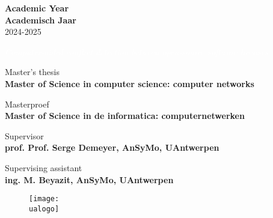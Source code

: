 
\thispagestyle{empty}
\sffamily %


\begin{flushright}
 {
	\textbf{Academic Year} \\
}{
	\textbf{Academisch Jaar} \\
}
2024-2025
\end{flushright}

\vspace{5cm}

\begin{flushleft}
\textcolor{white}{\colorbox{uawemain}
	{\Huge \emph{Computer-aided conflict detection between}}}
\textcolor{white}{\colorbox{uawemain}
	{\Huge \emph{open-source software licenses}}}

\vspace{2cm}

{\Large \textbf{\studentName}}


\vspace{5cm}
 {
	Master's thesis \\ \textbf{Master of Science in computer science: computer networks}

}{
	Masterproef \\ \textbf{Master of Science in de informatica: computernetwerken}
}

\vspace{3cm}
Supervisor \\ \textbf{prof. Prof. Serge Demeyer, AnSyMo, UAntwerpen}

Supervising assistant \\ \textbf{ing. M. Beyazit, AnSyMo, UAntwerpen}

\end{flushleft}


\begin{figure}[b]
\texttt{[image: \\ualogo]}
\end{figure}
      

